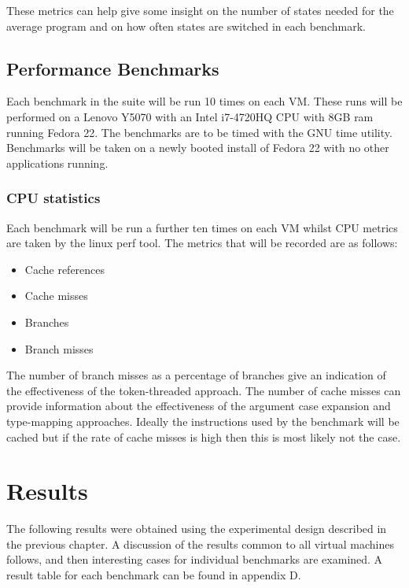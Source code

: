 \documentclass[english,a4paper,12pt]{report}
\begin{document}
These metrics can help give some insight on the number of states
needed for the average program and on how often states are switched in
each benchmark.


\section{Performance Benchmarks}

Each benchmark in the suite will be run 10 times on each VM. These
runs will be performed on a Lenovo Y5070 with an Intel i7-4720HQ CPU
with 8GB ram running Fedora 22. The benchmarks are to be timed with
the GNU time utility. Benchmarks will be taken on a newly booted
install of Fedora 22 with no other applications running.

\subsection{CPU statistics}

Each benchmark will be run a further ten times on each VM whilst CPU
metrics are taken by the linux perf tool. The metrics that will be
recorded are as follows:

\begin{itemize}
\item Cache references
\item Cache misses
\item Branches
\item Branch misses
\end{itemize}

The number of branch misses as a percentage of branches give an
indication of the effectiveness of the token-threaded approach. The
number of cache misses can provide information about the effectiveness
of the argument case expansion and type-mapping approaches. Ideally
the instructions used by the benchmark will be cached but if the rate
of cache misses is high then this is most likely not the case.

\chapter{Results}

The following results were obtained using the experimental design
described in the previous chapter. A discussion of the results common
to all virtual machines follows, and then interesting cases for
individual benchmarks are examined. A result table for each benchmark
can be found in appendix D.
\end{document}
